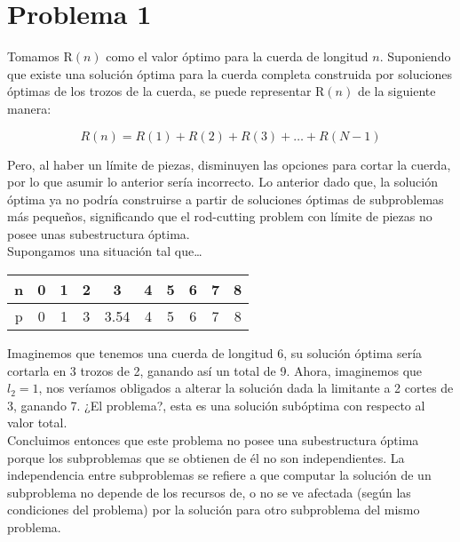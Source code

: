 \section*{Problema 1}
Tomamos R\((n)\) como el valor óptimo para la cuerda de longitud \(n\). Suponiendo que existe una solución óptima para la cuerda completa construida por soluciones óptimas de los trozos de la cuerda, se puede representar R\((n)\) de la siguiente manera:

\[ R(n) = R(1) + R(2) + R(3) + \dots + R(N-1) \]

Pero, al haber un límite de piezas, disminuyen las opciones para cortar la cuerda, por lo que asumir lo anterior sería incorrecto. Lo anterior dado que, la solución óptima ya no podría construirse a partir de soluciones óptimas de subproblemas más pequeños, significando que el rod-cutting problem con límite de piezas no posee unas subestructura óptima.\\

Supongamos una situación tal que\dots
\begin{center}
\begin{tabular}{cccccccccc}
\toprule
n & 0 & 1 & 2 & 3    & 4 & 5 & 6 & 7 & 8 \\ \hline
p & 0 & 1 & 3 & 3.54 & 4 & 5 & 6 & 7 & 8 \\ \hline
\end{tabular}
\end{center}
\hfill \break

Imaginemos que tenemos una cuerda de longitud 6, su solución óptima sería cortarla en 3 trozos de 2, ganando así un total de 9. Ahora, imaginemos que \(l_2 = 1\), nos veríamos obligados a alterar la solución dada la limitante a 2 cortes de 3, ganando 7. ¿El problema?, esta es una solución subóptima con respecto al valor total.\\

Concluimos entonces que este problema no posee una subestructura óptima porque los subproblemas que se obtienen de él no son independientes. La independencia entre subproblemas se refiere a que computar la solución de un subproblema no depende de los recursos de, o no se ve afectada (según las condiciones del problema) por la solución para otro subproblema del mismo problema.